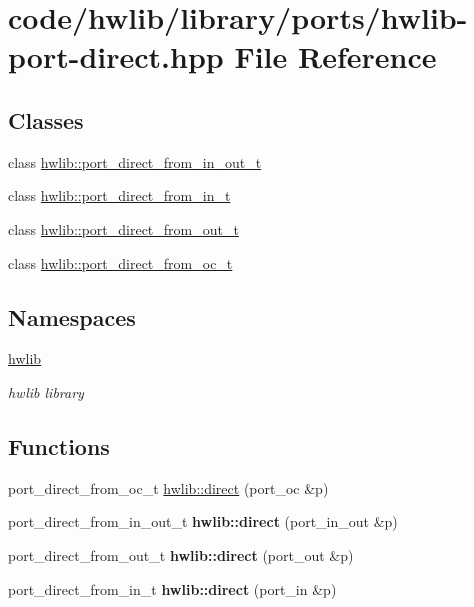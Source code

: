 \hypertarget{hwlib-port-direct_8hpp}{}\section{code/hwlib/library/ports/hwlib-\/port-\/direct.hpp File Reference}
\label{hwlib-port-direct_8hpp}
\subsection*{Classes}
\begin{DoxyCompactItemize}
\item 
class \hyperlink{classhwlib_1_1port__direct__from__in__out__t}{hwlib\+::port\+\_\+direct\+\_\+from\+\_\+in\+\_\+out\+\_\+t}
\item 
class \hyperlink{classhwlib_1_1port__direct__from__in__t}{hwlib\+::port\+\_\+direct\+\_\+from\+\_\+in\+\_\+t}
\item 
class \hyperlink{classhwlib_1_1port__direct__from__out__t}{hwlib\+::port\+\_\+direct\+\_\+from\+\_\+out\+\_\+t}
\item 
class \hyperlink{classhwlib_1_1port__direct__from__oc__t}{hwlib\+::port\+\_\+direct\+\_\+from\+\_\+oc\+\_\+t}
\end{DoxyCompactItemize}
\subsection*{Namespaces}
\begin{DoxyCompactItemize}
\item 
 \hyperlink{namespacehwlib}{hwlib}
\begin{DoxyCompactList}\small\item\em hwlib library \end{DoxyCompactList}\end{DoxyCompactItemize}
\subsection*{Functions}
\textbf{ }\par
\begin{DoxyCompactItemize}
\item 
port\+\_\+direct\+\_\+from\+\_\+oc\+\_\+t \hyperlink{namespacehwlib_a68091f0a605af40f86570f100909f6b5}{hwlib\+::direct} (port\+\_\+oc \&p)
\item 
\mbox{\label{namespacehwlib_a77c7d15d33676d70ade4edebdd484f02}} 
port\+\_\+direct\+\_\+from\+\_\+in\+\_\+out\+\_\+t {\bfseries hwlib\+::direct} (port\+\_\+in\+\_\+out \&p)
\item 
\mbox{\label{namespacehwlib_a0adb355aaa7d356168fe6f14efbf2276}} 
port\+\_\+direct\+\_\+from\+\_\+out\+\_\+t {\bfseries hwlib\+::direct} (port\+\_\+out \&p)
\item 
\mbox{\label{namespacehwlib_a8c35e5521540c609bb0021dce2cd9c35}} 
port\+\_\+direct\+\_\+from\+\_\+in\+\_\+t {\bfseries hwlib\+::direct} (port\+\_\+in \&p)
\end{DoxyCompactItemize}

